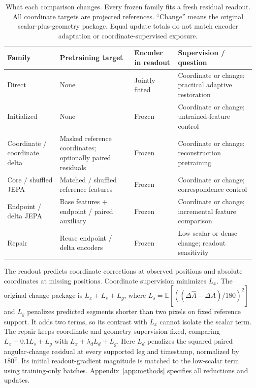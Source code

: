 \documentclass{article}
\newcommand{\E}{\mathbb{E}}
\begin{document}
\begin{table}[t]\centering\small
\caption{What each comparison changes. Every frozen family fits a fresh residual readout. All coordinate targets are projected references. ``Change'' means the original scalar-plus-geometry package. Equal update totals do not match encoder adaptation or coordinate-supervised exposure.}
\label{tab:design}
\setlength{\tabcolsep}{3pt}
\begin{tabular}{>{\raggedright\arraybackslash}p{.93in}>{\raggedright\arraybackslash}p{1.50in}>{\raggedright\arraybackslash}p{.60in}>{\raggedright\arraybackslash}p{2.07in}}\toprule
Family & Pretraining target & Encoder in readout & Supervision / question \\\midrule
Direct & None & Jointly fitted & Coordinate or change; practical adaptive restoration \\
Initialized & None & Frozen & Coordinate or change; untrained-feature control \\
Coordinate / coordinate delta & Masked reference coordinates; optionally paired residuals & Frozen & Coordinate or change; reconstruction pretraining \\
Core / shuffled JEPA & Matched / shuffled reference features & Frozen & Coordinate or change; correspondence control \\
Endpoint / delta JEPA & Base features + endpoint / paired auxiliary & Frozen & Coordinate or change; incremental feature comparison \\
Repair & Reuse endpoint / delta encoders & Frozen & Low scalar or dense change; readout sensitivity \\\bottomrule
\end{tabular}
\end{table}

The readout predicts coordinate corrections at observed positions and absolute coordinates at missing positions. Coordinate supervision minimizes $L_x$. The original change package is $L_x+L_s+L_g$, where $L_s=\E[((\Delta\widehat A-\Delta A)/180)^2]$ and $L_g$ penalizes predicted segments shorter than two pixels on fixed reference support. It adds two terms, so its contrast with $L_x$ cannot isolate the scalar term. The repair keeps coordinate and geometry supervision fixed, comparing $L_x+0.1L_s+L_g$ with $L_x+\lambda_dL_d+L_g$. Here $L_d$ penalizes the squared paired angular-change residual at every supported leg and timestamp, normalized by $180^2$. Its initial readout-gradient magnitude is matched to the low-scalar term using training-only batches. Appendix~\ref{app:methods} specifies all reductions and updates.
\end{document}
